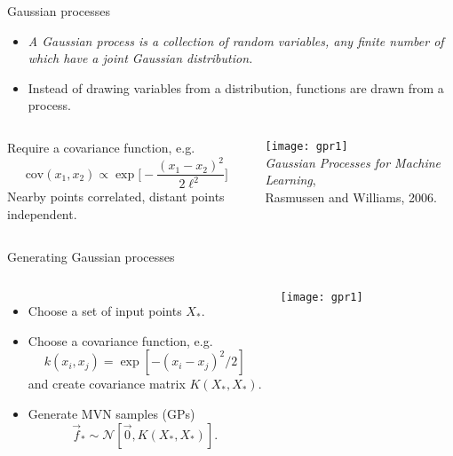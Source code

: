 \documentclass{beamer}
\begin{document}
\begin{frame}[label=gp]{Gaussian processes}


  \begin{itemize}
    \item \emph{A Gaussian process is a collection of random variables, any finite number of which have a joint Gaussian distribution.}
    \item Instead of drawing variables from a distribution, functions are drawn from a process.
  \end{itemize}



  \begin{columns}[c]
    Require a covariance function, e.g.
    \begin{equation*}
      \text{cov}(x_1,x_2) \propto \exp \biggl[ -\frac{(x_1 - x_2)^2}{2\ell^2} \biggr]
    \end{equation*}
    Nearby points correlated, distant points independent.

    \texttt{[image: gpr1]} \\[1ex]
    \raggedleft\tiny \emph{Gaussian Processes for Machine Learning}, \\ Rasmussen and Williams, 2006.
  \end{columns}

\end{frame}


\begin{frame}{Generating Gaussian processes}
  \begin{columns}
    \begin{itemize}
      \item Choose a set of input points $X_*$.
      \item Choose a covariance function, e.g.\
        \begin{equation*}
          k(x_i,x_j) = \exp[-(x_i-x_j)^2/2]
        \end{equation*}
        and create covariance matrix $K(X_*,X_*)$.
      \item Generate MVN samples (GPs)
        \begin{equation*}
          \vec f_* \sim \mathcal N[\vec 0,K(X_*,X_*)].
        \end{equation*}
    \end{itemize}

    \texttt{[image: gpr1]}
  \end{columns}

\end{frame}
\end{document}
